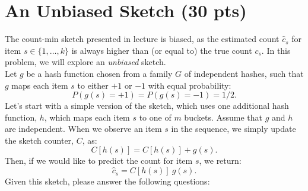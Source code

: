 \documentclass{exam}
\begin{document}
\newpage
\section{An Unbiased Sketch (30 pts)}
  The count-min sketch presented in lecture is {biased}, as the estimated count $\hat{c}_s$ for item $s \in \{1,\ldots,k\}$ is always
  higher than (or equal to) the true count $c_s$. In this problem,
  we will explore an \textit{unbiased} sketch.  \\

\noindent Let
  $g$ be a hash function chosen from a family $G$ of independent
  hashes, such that $g$ maps each item $s$ to either $+1$ or $-1$ with
  equal probability:
 \[
 P(g(s) = +1) = P(g(s) = -1) = 1/2. 
 \]
 Let's start with a simple version of the sketch, which uses one additional hash function, $h$, which maps each item $s$ to one of $m$ buckets. 
Assume that $g$ and $h$ are independent. When we observe an item $s$ in the
sequence, we simply update the sketch counter, $C$, as:
\[
C[h(s)] =C[h(s)] + g(s).
\]
Then, if we would like to predict the count for item $s$,
we return:
\[
\hat{c}_s = C[h(s)] \  g(s).
\]
Given this sketch, please answer the following questions:
\end{document}
